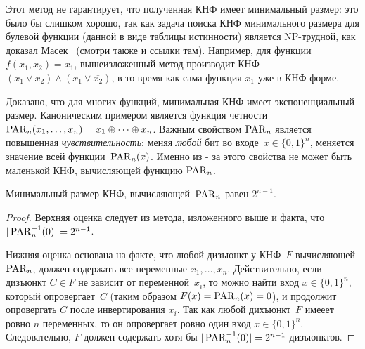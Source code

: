 Этот метод не гарантирует, что полученная КНФ имеет минимальный размер: это было бы слишком хорошо, так как задача поиска КНФ минимального размера для булевой функции (данной в виде таблицы истинности) является NP-трудной, как доказал Масек~\cite{MasekNpComp} (смотри также \cite{DBLP:journals/siamcomp/AllenderHMPS08} и ссылки там).
Например, для функции $f(x_1,x_2)=x_1$, вышеизложенный метод производит КНФ $({x_1} \lor x_2) \land ({x_1} \lor \overline{x_2})$, в то время как сама функция $x_1$ уже в КНФ форме.

Доказано, что для многих функций, минимальная КНФ имеет экспоненциальный размер. Каноническим примером является функция четности $\operatorname{PAR}_n(x_1, \dotsc, x_n)=x_1 \oplus \dotsb \oplus x_n$. Важным свойством $\operatorname{PAR}_n$ является повышенная \emph{чувствительность}: меняя \emph{любой} бит во входе~$x \in \{0,1\}^n$, меняется значение всей функции~$\operatorname{PAR}_n(x)$. Именно из - за этого свойства не может быть маленькой КНФ, вычисляющей функцию $\operatorname{PAR}_n$.

\begin{lemma}\label{lemma:detparity}
	Минимальный размер КНФ, вычисляющей~$\operatorname{PAR}_n$ равен $2^{n-1}$.
\end{lemma}
\begin{proof}
	Верхняя оценка следует из метода, изложенного выше и факта, что $|\operatorname{PAR}_n^{-1}(0)|=2^{n-1}$.
	
	Нижняя оценка основана на факте, что любой дизъюнкт у КНФ~$F$ вычисляющей $\operatorname{PAR}_n$, должен содержать все переменные $x_1, \dotsc, x_n$.
	Действительно, если дизъюнкт $C \in F$ не зависит от переменной~$x_i$, то можно найти вход $x \in \{0,1\}^n$, который опровергает~$C$ (таким образом $F(x)=\operatorname{PAR}_n(x)=0$), и продолжит опровергать $C$ после инвертирования $x_i$. 
	Так как любой дихъюнкт~$F$ имееет ровно $n$ переменных, то он опровергает ровно один вход $x \in \{0,1\}^n$. Следовательно, $F$ должен содержать хотя бы  $|\operatorname{PAR}_n^{-1}(0)|=2^{n-1}$ дизъюнктов.
\end{proof}

